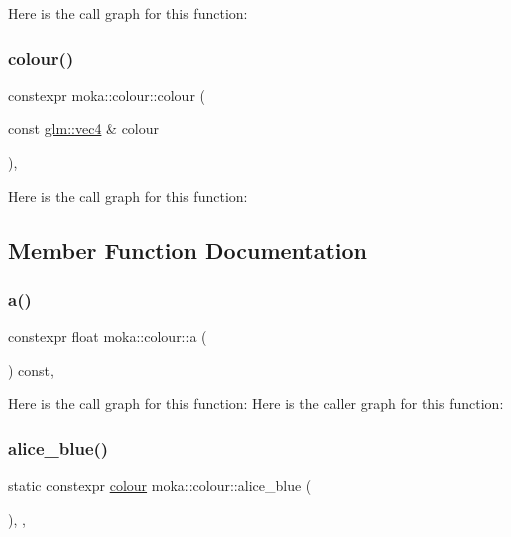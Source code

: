 Here is the call graph for this function\+:
\mbox{\label{classmoka_1_1colour_aadf7f1fda733557fd18fac24081b75e5}} 
\subsubsection{\texorpdfstring{colour()}{colour()}\hspace{0.1cm}{\footnotesize\ttfamily [6/6]}}
{\footnotesize\ttfamily constexpr moka\+::colour\+::colour (\begin{DoxyParamCaption}\item[{const \mbox{\hyperlink{namespacemoka_aed2224bc0e5b79e57a8975ded94ee1aaa1a9028fd802c481a99491a418ca2fe86}{glm\+::vec4}} \&}]{colour }\end{DoxyParamCaption})\hspace{0.3cm}{\ttfamily [inline]}, {\ttfamily [noexcept]}}

Here is the call graph for this function\+:


\subsection{Member Function Documentation}
\mbox{\label{classmoka_1_1colour_ac2a9d008b8201e9e2b3518f3e1d2de7e}} 
\subsubsection{\texorpdfstring{a()}{a()}}
{\footnotesize\ttfamily constexpr float moka\+::colour\+::a (\begin{DoxyParamCaption}{ }\end{DoxyParamCaption}) const\hspace{0.3cm}{\ttfamily [inline]}, {\ttfamily [noexcept]}}

Here is the call graph for this function\+:
Here is the caller graph for this function\+:
\mbox{\label{classmoka_1_1colour_af1c552c481818c9378f5abeb2214889b}} 
\subsubsection{\texorpdfstring{alice\_blue()}{alice\_blue()}}
{\footnotesize\ttfamily static constexpr \mbox{\hyperlink{classmoka_1_1colour}{colour}} moka\+::colour\+::alice\+\_\+blue (\begin{DoxyParamCaption}{ }\end{DoxyParamCaption})\hspace{0.3cm}{\ttfamily [inline]}, {\ttfamily [static]}, {\ttfamily [noexcept]}}


